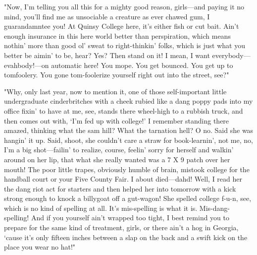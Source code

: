   "Now, I'm telling you all this for a mighty good reason, girls---and paying it
no mind, you'll find me as unsociable a creature as ever chawed gum, I
guarandamntee you! At Quinsy College here, it's either fish or cut bait. Ain't
enough insurance in this here world better than perspiration, 
which means nothin' more than good ol' sweat to right-thinkin' folks, which is 
just what you better be aimin' to be, hear? Yes? Then stand on it! I mean, I 
want everybody---evahbody!---on automatic here! You mope. 
You get bounced. You get up to
tomfoolery. You gone tom-foolerize yourself right out into the street, see?"

  "Why, only last year, now to mention it, one of those self-important little
undergraduate cinderbritches with a cheek rubied like a dang poppy pads into my
office fixin' to have at me, see, stands there wheel-high to a rubbish truck,
and then comes out with, `I'm fed up with college!' I remember standing there
amazed, thinking what the sam hill? What the tarnation 
hell? O no. Said she was
hangin' it up. Said, shoot, she couldn't care a straw for book-learnin', not me,
no, I'm a big shot---failin' to realize, course, feelin' sorry for herself and
walkin' around on her lip, that what she really wanted was a 7 X 9 patch over
her mouth! The poor little trapes, 
obviously humble of brain, mistook college
for the handball court or your Five County Fair. I about died---dahd! Well, 
I read her the dang riot act for starters and then helped her into tomorrow 
with a kick strong enough to knock a billygoat off a gut-wagon! 
She spelled college f-u-n,
see, which is no kind of spelling at all. It's mis-spelling is what it is.
Mis-dang-spelling! And if you yourself ain't wrapped too tight, I best remind
you to prepare for the same kind of treatment, girls, or there ain't a hog 
in Georgia, `cause it's only fifteen inches between a slap on the back and 
a swift kick on the place you wear no hat!"
 
